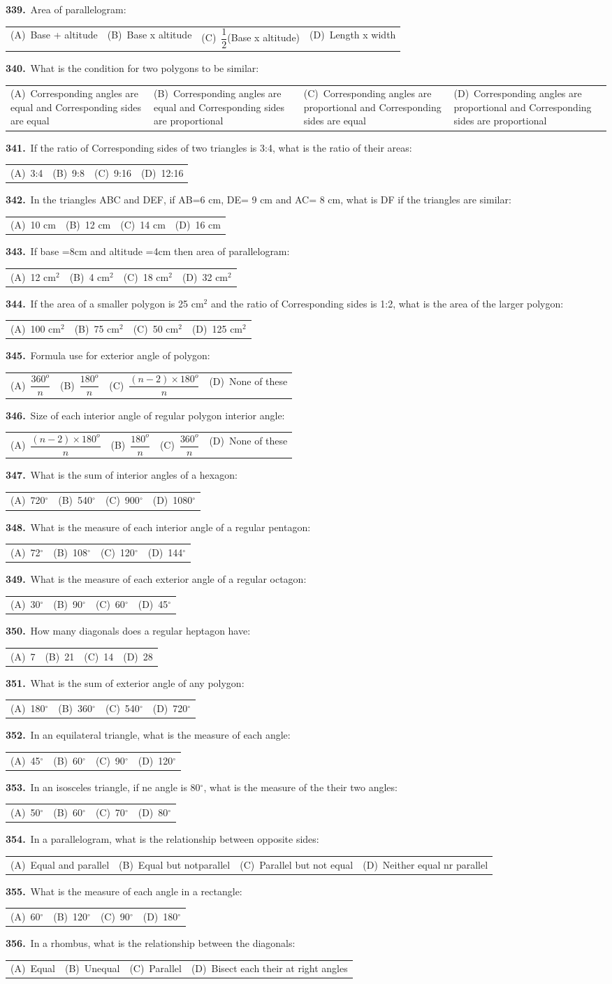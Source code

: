 \documentclass[11pt,a4paper]{article}
\makeatletter
\newcommand{\mcq}[6]{%
  \Needspace{4\baselineskip}%
  \par\medskip\noindent\textbf{#1.}\ #2\par\nopagebreak
  \noindent\begin{tabularx}{\linewidth}{@{\hspace{1.5em}}*{4}{>{\raggedright\arraybackslash}X}@{}}
    (A)~#3 & (B)~#4 & (C)~#5 & (D)~#6
  \end{tabularx}\par}
\makeatother
\begin{document}
\mcq{339}{Area of parallelogram:}{Base + altitude}{Base x altitude}{$\dfrac{1}{2}$(Base x altitude)}{Length x width}
\mcq{340}{What is the condition for two polygons to be similar:}{Corresponding angles are equal and Corresponding sides are equal}{Corresponding angles are equal and Corresponding sides are proportional}{Corresponding angles are proportional and Corresponding sides are equal}{Corresponding angles are proportional and Corresponding sides are proportional}
\mcq{341}{If the ratio of Corresponding sides of two triangles is 3:4, what is the ratio of their areas:}{3:4}{9:8}{9:16}{12:16}
\mcq{342}{In the triangles ABC and DEF, if AB=6 cm, DE= 9 cm and AC= 8 cm, what is DF if the triangles are similar:}{10 cm}{12 cm}{14 cm}{16 cm}
\mcq{343}{If base =8cm and altitude =4cm then area of parallelogram:}{12 cm$^{2}$}{4 cm$^{2}$}{18 cm$^{2}$}{32 cm$^{2}$}
\mcq{344}{If the area of a smaller polygon is 25 cm$^{2}$ and the ratio of Corresponding sides is 1:2, what is the area of the larger polygon:}{100 cm$^{2}$}{75 cm$^{2}$}{50 cm$^{2}$}{125 cm$^{2}$}
\mcq{345}{Formula use for exterior angle of polygon:}{$\dfrac{360^{o}}{n}$}{$\dfrac{180^{o}}{n}$}{$\dfrac{(n-2)\times 180^{o}}{n}$}{None of these}
\mcq{346}{Size of each interior angle of regular polygon interior angle:}{$\dfrac{(n-2)\times 180^{o}}{n}$}{$\dfrac{180^{o}}{n}$}{$\dfrac{360^{o}}{n}$}{None of these}
\mcq{347}{What is the sum of interior angles of a hexagon:}{720$^{\circ}$}{540$^{\circ}$}{900$^{\circ}$}{1080$^{\circ}$}
\mcq{348}{What is the measure of each interior angle of a regular pentagon:}{72$^{\circ}$}{108$^{\circ}$}{120$^{\circ}$}{144$^{\circ}$}
\mcq{349}{What is the measure of each exterior angle of a regular octagon:}{30$^{\circ}$}{90$^{\circ}$}{60$^{\circ}$}{45$^{\circ}$}
\mcq{350}{How many diagonals does a regular heptagon have:}{7}{21}{14}{28}
\mcq{351}{What is the sum of exterior angle of any polygon:}{180$^{\circ}$}{360$^{\circ}$}{540$^{\circ}$}{720$^{\circ}$}
\mcq{352}{In an equilateral triangle, what is the measure of each angle:}{45$^{\circ}$}{60$^{\circ}$}{90$^{\circ}$}{120$^{\circ}$}
\mcq{353}{In an isosceles triangle, if ne angle is 80$^{\circ}$, what is the measure of the their two angles:}{50$^{\circ}$}{60$^{\circ}$}{70$^{\circ}$}{80$^{\circ}$}
\mcq{354}{In a parallelogram, what is the relationship between opposite sides:}{Equal and parallel}{Equal but notparallel}{Parallel but not equal}{Neither equal nr parallel}
\mcq{355}{What is the measure of each angle in a rectangle:}{60$^{\circ}$}{120$^{\circ}$}{90$^{\circ}$}{180$^{\circ}$}
\mcq{356}{In a rhombus, what is the relationship between the diagonals:}{Equal}{Unequal}{Parallel}{Bisect each their at right angles}
\end{document}
